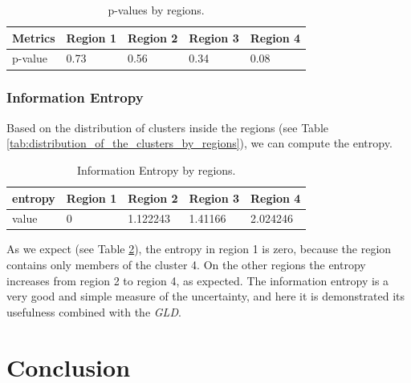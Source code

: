 \documentclass[11pt]{article}
\begin{document}
\begin{table}[ht]
\begin{center}
    \begin{tabular}{|l|l|l|l|l|}
    \hline
    \textbf{Metrics} & \textbf{Region 1} &  \textbf{Region 2} &  \textbf{Region 3} &   \textbf{Region 4}  \\ \hline
    p-value     & 0.73   		& 0.56 & 0.34 & 0.08            \\ \hline
    \end{tabular}
    \caption {p-values by regions.}
    \label{tab:p_values_by_regions}
    \end{center}
\end{table}



\subsubsection{Information Entropy}\label{informationEntropyresults}

Based on the distribution of clusters inside the regions (see Table \ref{tab:distribution_of_the_clusters_by_regions}), we can compute the entropy. 

\begin{table}[ht]
\begin{center}
    \begin{tabular}{|l|l|l|l|l|}
    \hline
    \textbf{entropy} & \textbf{Region 1} &  \textbf{Region 2} &  \textbf{Region 3} &   \textbf{Region 4}  \\ \hline
    value     & 0   		& 1.122243 & 1.41166 & 2.024246            \\ \hline
    \end{tabular}
    \caption {Information Entropy by regions.}
    \label{tab:entropy_by_regions}
    \end{center}
\end{table}

As we expect (see Table \ref{tab:entropy_by_regions}), the entropy in region 1 is zero, because the region contains only members of the cluster 4. On the other regions the entropy increases from region 2 to region 4, as expected. The information entropy is a very good and simple measure of the uncertainty, and here it is demonstrated its usefulness combined with the \textit{GLD}.

 

\section{Conclusion}
\label{Conclusions}
\end{document}
